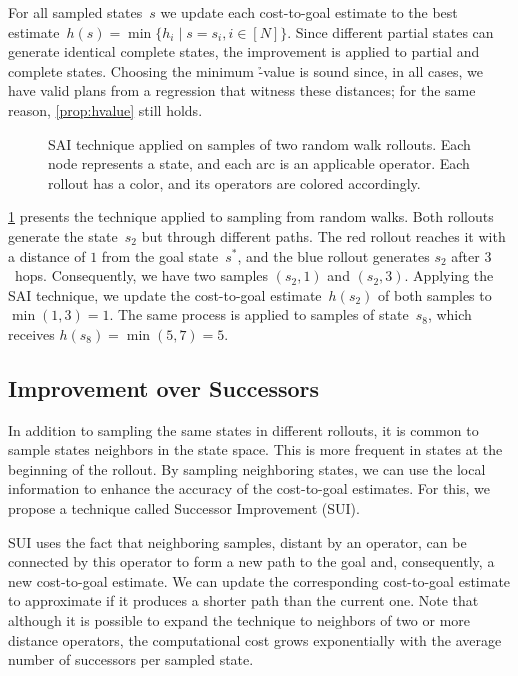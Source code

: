 For all sampled states~$s$ we update each cost-to-goal estimate to the best estimate~$h(s) = \min\{h_i \mid s=s_i, i\in[N]\}$. Since different partial states can generate identical complete states, the improvement is applied to partial and complete states. Choosing the minimum \h-value is sound since, in all cases, we have valid plans from a regression that witness these distances; for the same reason, \cref{prop:hvalue} still holds.

\begin{figure}[tb]
    \caption[SAI technique applied on samples of random walk rollouts.]{SAI technique applied on samples of two random walk rollouts. Each node represents a state, and each arc is an applicable operator. Each rollout has a color, and its operators are colored accordingly.}
    \label{fig:sai}
    \addmargin
    \centering
    
\end{figure}

\cref{fig:sai} presents the technique applied to sampling from random walks. Both rollouts generate the state~$s_2$ but through different paths. The red rollout reaches it with a distance of $1$ from the goal state~$s^*$, and the blue rollout generates $s_2$ after $3$~hops. Consequently, we have two samples $(s_2,1)$ and $(s_2,3)$. Applying the SAI technique, we update the cost-to-goal estimate~$h(s_2)$ of both samples to $\min(1,3)=1$. The same process is applied to samples of state~$s_8$, which receives $h(s_8)=\min(5,7)=5$.

\subsection{Improvement over Successors}
\label{sec:sui}

In addition to sampling the same states in different rollouts, it is common to sample states neighbors in the state space. This is more frequent in states at the beginning of the rollout. By sampling neighboring states, we can use the local information to enhance the accuracy of the cost-to-goal estimates. For this, we propose a technique called Successor Improvement (SUI).

SUI uses the fact that neighboring samples, distant by an operator, can be connected by this operator to form a new path to the goal and, consequently, a new cost-to-goal estimate. We can update the corresponding cost-to-goal estimate to approximate \hstar if it produces a shorter path than the current one. Note that although it is possible to expand the technique to neighbors of two or more distance operators, the computational cost grows exponentially with the average number of successors per sampled state.

